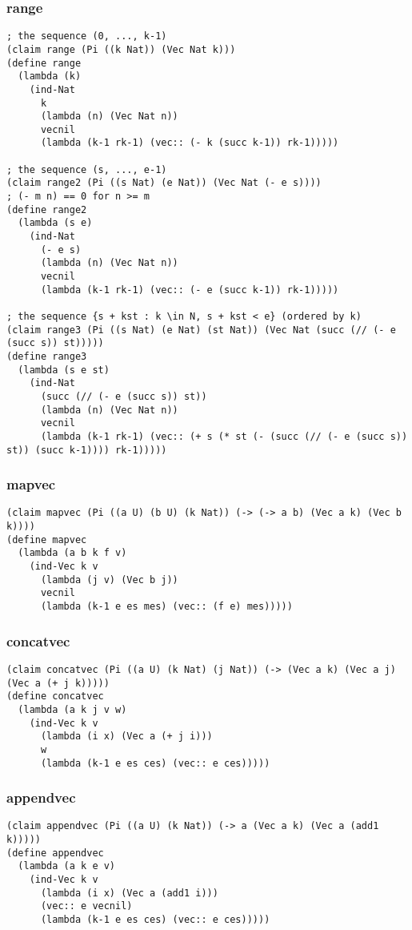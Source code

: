 \subsubsection{range} \label{code:range}
\begin{lstlisting}
; the sequence (0, ..., k-1)
(claim range (Pi ((k Nat)) (Vec Nat k)))
(define range
  (lambda (k)
    (ind-Nat
      k
      (lambda (n) (Vec Nat n))
      vecnil
      (lambda (k-1 rk-1) (vec:: (- k (succ k-1)) rk-1)))))

; the sequence (s, ..., e-1)
(claim range2 (Pi ((s Nat) (e Nat)) (Vec Nat (- e s))))
; (- m n) == 0 for n >= m
(define range2
  (lambda (s e)
    (ind-Nat
      (- e s)
      (lambda (n) (Vec Nat n))
      vecnil
      (lambda (k-1 rk-1) (vec:: (- e (succ k-1)) rk-1)))))

; the sequence {s + kst : k \in N, s + kst < e} (ordered by k)
(claim range3 (Pi ((s Nat) (e Nat) (st Nat)) (Vec Nat (succ (// (- e (succ s)) st)))))
(define range3
  (lambda (s e st)
    (ind-Nat
      (succ (// (- e (succ s)) st))
      (lambda (n) (Vec Nat n))
      vecnil
      (lambda (k-1 rk-1) (vec:: (+ s (* st (- (succ (// (- e (succ s)) st)) (succ k-1)))) rk-1)))))
\end{lstlisting}

\subsubsection{mapvec} \label{code:mapvec}
\begin{lstlisting}
(claim mapvec (Pi ((a U) (b U) (k Nat)) (-> (-> a b) (Vec a k) (Vec b k))))
(define mapvec
  (lambda (a b k f v)
    (ind-Vec k v
      (lambda (j v) (Vec b j))
      vecnil
      (lambda (k-1 e es mes) (vec:: (f e) mes)))))
\end{lstlisting}

\subsubsection{concatvec} \label{code:concatvec}
\begin{lstlisting}
(claim concatvec (Pi ((a U) (k Nat) (j Nat)) (-> (Vec a k) (Vec a j) (Vec a (+ j k)))))
(define concatvec
  (lambda (a k j v w)
    (ind-Vec k v
      (lambda (i x) (Vec a (+ j i)))
      w
      (lambda (k-1 e es ces) (vec:: e ces)))))
\end{lstlisting}

\subsubsection{appendvec} \label{code:appendvec}
\begin{lstlisting}
(claim appendvec (Pi ((a U) (k Nat)) (-> a (Vec a k) (Vec a (add1 k)))))
(define appendvec
  (lambda (a k e v)
    (ind-Vec k v
      (lambda (i x) (Vec a (add1 i)))
      (vec:: e vecnil)
      (lambda (k-1 e es ces) (vec:: e ces)))))
\end{lstlisting}

